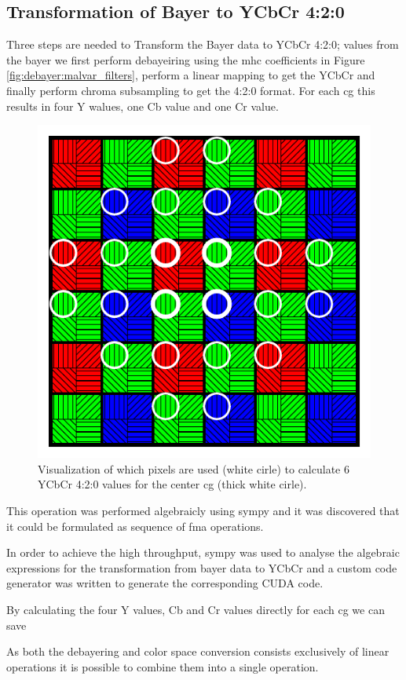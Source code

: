 \subsection{Transformation of Bayer to YCbCr 4:2:0}
Three steps are needed to Transform the Bayer data to YCbCr 4:2:0; values from the bayer we first perform debayeiring using the \gls{mhc} coefficients in Figure \ref{fig:debayer:malvar_filters}, perform a linear mapping to get the YCbCr and finally perform chroma subsampling to get the 4:2:0 format.
For each \gls{cg} this results in four Y walues, one Cb value and one Cr value.



\begin{figure}[H]
    \centering
    \includegraphics[width=.5\textwidth]{figures/polarized_image/normal_conv.pdf}
    \caption{Visualization of which pixels are used (white cirle) to calculate 6 YCbCr 4:2:0 values for the center \gls{cg} (thick white cirle).}
    \label{fig:saperation}
\end{figure}

This operation was performed algebraicly using \gls{sympy} and it was discovered that it could be formulated as sequence of \gls{fma} operations.

In order to achieve the high throughput, \gls{sympy} was used to analyse the algebraic expressions for the transformation from bayer data to YCbCr and a custom code generator was written to generate the corresponding CUDA code.


By calculating the four Y values, Cb and Cr values directly for each \gls{cg} we can save





As both the debayering and color space conversion consists exclusively of linear operations it is possible to combine them into a single operation.


